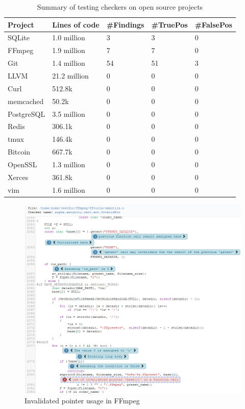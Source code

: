 \begin{table}[H]
	\centering
	\begin{tabular}{ | m{} | m{} | m{} | m{}  | m{} |}
		\hline
		\textbf{Project} & \textbf{Lines of code} & \textbf{\#Findings} & \textbf{\#TruePos} & \textbf{\#FalsePos}\\
		\hline \hline
		SQLite & 1.0 million & 3 & 3 & 0\\
		\hline
		FFmpeg & 1.9 million & 7 & 7 & 0\\
		\hline
		Git & 1.4 million & 54 & 51 & 3\\
		\hline
		LLVM & 21.2 million & 0 & 0 & 0\\
		\hline
		Curl & 512.8k & 0 & 0 & 0\\
		\hline
		memcached & 50.2k & 0 & 0 & 0\\
		\hline
		PostgreSQL & 3.5 million & 0 & 0 & 0\\
		\hline
		Redis & 306.1k & 0 & 0 & 0\\
		\hline
		tmux & 146.4k & 0 & 0 & 0\\
		\hline
		Bitcoin & 667.7k & 0 & 0 & 0\\
		\hline
		OpenSSL & 1.3 million & 0 & 0 & 0\\
		\hline
		Xerces & 361.8k & 0 & 0 & 0\\
		\hline
		vim & 1.6 million  & 0 & 0 & 0\\
		\hline
	\end{tabular}
	\caption{Summary of testing checkers on open source projects}
	\label{tab:codbases}
\end{table}


\begin{figure}[H]
	\centering
	\includegraphics[width=\textwidth]{images/ffmpeg.png}
	\caption{Invalidated pointer usage in FFmpeg}
	\label{fig:ffmpeg-rep}
\end{figure}

